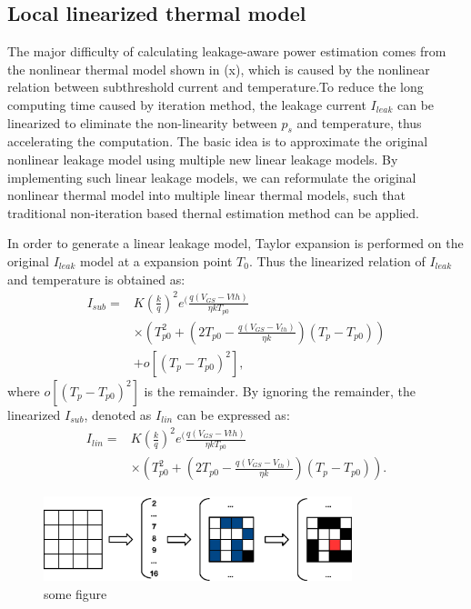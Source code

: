 \subsection{Local linearized thermal model}
The major difficulty of calculating leakage-aware power estimation comes from the nonlinear thermal model shown in (x), which is caused by the nonlinear relation between subthreshold current and temperature.To reduce the long computing time caused by iteration method, the leakage current $I_{leak}$ can be linearized to eliminate the non-linearity between $p_{s}$ and temperature, thus accelerating the computation. The basic idea is to approximate the original nonlinear leakage model using multiple new linear leakage models. By implementing such linear leakage models, we can reformulate the original nonlinear thermal model into multiple linear thermal models, such that traditional non-iteration based thernal estimation method can be applied.

In order to generate a linear leakage model, Taylor expansion is performed on the original $I_{leak}$ model at a expansion point $T_{0}$. Thus the linearized relation of $I_{leak}$ and temperature is obtained as:
\begin{equation}\label{linear_subthreshold}
\begin{split}
I_{sub} = &K(\frac{k}{q})^{2}e^(\frac{q(V_{GS}-V{th})}{\eta kT_{p0}}\\
&\times (T_{p0}^{2}+(2T_{p0}-\frac{q(V_{GS}-V_{th})}{\eta k})(T_{p}-T_{p0}))\\
&+ o[(T_{p}-T_{p0})^{2}],
\end{split}
\end{equation}
where $o[(T_{p}-T_{p0})^{2}]$ is the remainder. By ignoring the remainder, the linearized $I_{sub}$, denoted as $I_{lin}$ can be expressed as:
\begin{equation}\label{linear_subthreshold}
\begin{split}
I_{lin} = &K(\frac{k}{q})^{2}e^(\frac{q(V_{GS}-V{th})}{\eta kT_{p0}}\\
&\times (T_{p0}^{2}+(2T_{p0}-\frac{q(V_{GS}-V_{th})}{\eta k})(T_{p}-T_{p0})).
\end{split}
\end{equation}


\begin{figure}[htb]
\centering
\includegraphics[width=0.8\textwidth]{fig/greedy_method.eps}
\caption{some figure}
\end{figure}


